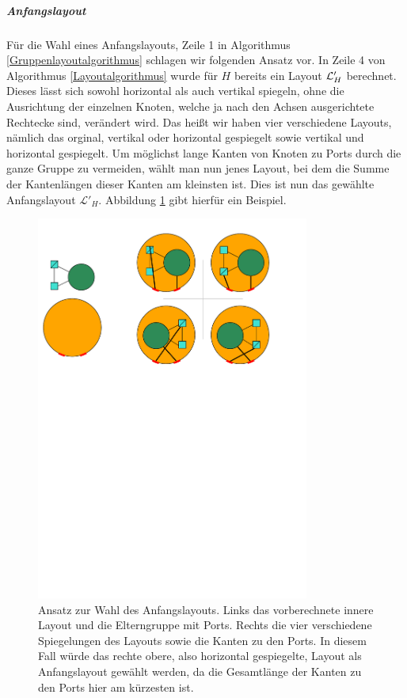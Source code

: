 \subparagraph{Anfangslayout}

Für die Wahl eines Anfangslayouts, Zeile 1 in Algorithmus \ref{Gruppenlayoutalgorithmus} schlagen wir folgenden Ansatz vor.
In Zeile 4 von Algorithmus \ref{Layoutalgorithmus} wurde für $H$ bereits ein Layout $\mathcal{L}'_H$ berechnet. 
Dieses lässt sich sowohl horizontal als auch vertikal spiegeln, ohne die Ausrichtung der einzelnen Knoten, welche ja nach den Achsen ausgerichtete Rechtecke sind, verändert wird.
Das heißt wir haben vier verschiedene Layouts, nämlich das orginal, vertikal oder horizontal gespiegelt sowie vertikal und horizontal gespiegelt.
Um möglichst lange Kanten von Knoten zu Ports durch die ganze Gruppe zu vermeiden, wählt man nun jenes Layout,
bei dem die Summe der Kantenlängen dieser Kanten am kleinsten ist. Dies ist nun  das gewählte Anfangslayout $\mathcal{L}'_H$.
Abbildung \ref{f:Anfangslayout} gibt hierfür ein Beispiel.

\begin{figure}[h!]
\begin{center} 
  \includegraphics[width=0.8\textwidth]{Pics/Anfangslayout.pdf}
  \caption{Ansatz zur Wahl des Anfangslayouts. Links das vorberechnete innere Layout und die Elterngruppe mit Ports. Rechts die vier verschiedene Spiegelungen des Layouts sowie die Kanten zu den Ports.
  In diesem Fall würde das rechte obere, also horizontal gespiegelte, Layout als Anfangslayout gewählt werden, da die Gesamtlänge der Kanten zu den Ports hier am kürzesten ist.}
  \label{f:Anfangslayout}
\end{center}
\end{figure}

